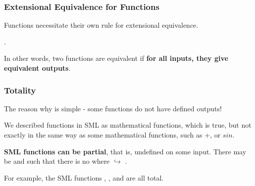 \documentclass[aspectratio=169]{beamer}
\begin{document}
\begin{frame}[fragile]
  \frametitle{Extensional Equivalence for Functions}

  Functions necessitate their own rule for extensional equivalence.

  \vspace{\fill}

  .

  \vspace{5pt}

  In other words, two functions are equivalent if \textbf{for all inputs, they give equivalent outputs}.

  \vspace{\fill}
  
\end{frame}

\begin{frame}[fragile]
  \frametitle{Totality}

  The reason why is simple - some functions do not have defined outputs!

  \vspace{\fill}

  We described functions in SML as mathematical functions, which is true, but not exactly in the
  same way as some mathematical functions, such as $+$, or $sin$.

  \vspace{5pt}

  \textbf{SML functions can be partial}, that is, undefined on some input. There may be 
  and  such that there is no  where  $\hookrightarrow$ .  

  \vspace{\fill}


  \vspace{5pt}

  For example, the SML functions \code{+}, , and \code{^} are all total.
\end{frame}
\end{document}
